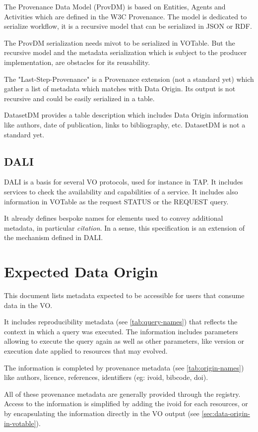 \documentclass[11pt,a4paper]{ivoa}
\begin{document}
The Provenance Data Model (ProvDM) is based on Entities, Agents and Activities which are defined in the W3C Provenance. The model is dedicated to serialize workflow,
it is a recursive model that can be serialized in JSON or RDF.

The ProvDM serialization needs mivot to be serialized in VOTable. But the recursive model and the metadata serialization which is subject to the producer implementation, are obstacles for its reusability.


The "Last-Step-Provenance" is a Provenance extension (not a standard yet) which gather a list of metadata which matches with Data Origin. Its output is not recursive and could be easily serialized in a table.


DatasetDM provides a table description which includes Data Origin information like authors, date of publication, links to bibliography, etc.
DatasetDM is not a standard yet.

\subsection{DALI}
DALI \citep{2017ivoa.spec.0517D} is a basis for several VO protocols, used for instance in TAP. It includes services to  check the availability and capabilities of a service. It includes also information in VOTable as the request STATUS or the REQUEST query.

It already defines bespoke names for  elements used to convey additional metadata, in particular \emph{citation}.  In a sense, this specification is an extension of the mechanism defined in DALI.

\section{Expected Data Origin}
This document lists metadata expected to be accessible for users that consume data in the VO.

It includes reproducibility metadata (see \ref{tab:query-names}) that reflects the context in which a query was executed. The information includes parameters allowing to execute the query again as well as other parameters, like version or execution date applied to resources that may evolved.


The information is completed by provenance metadata (see \ref{tab:origin-names}) like authors, licence, references, identifiers (eg: ivoid, bibcode, doi).

All of these provenance metadata are generally provided through the registry. Access to the information is simplified by adding the ivoid for each resources, or by encapsulating the information directly in the VO output (see \ref{sec:data-origin-in-votable}).
\end{document}
